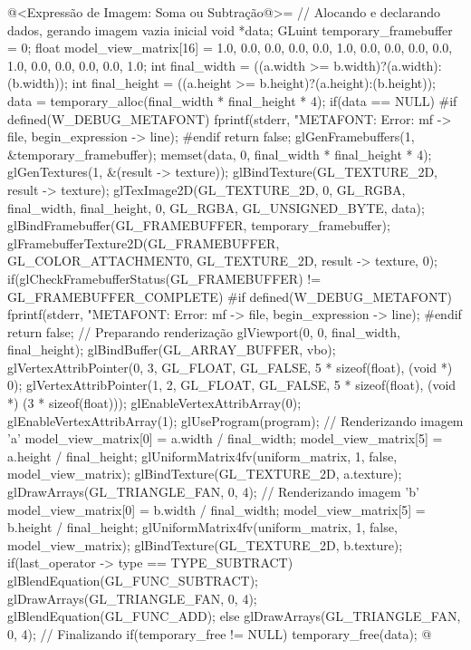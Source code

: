 {\iniciocodigo
@<Expressão de Imagem: Soma ou Subtração@>=
// Alocando e declarando dados, gerando imagem vazia inicial
void *data;
GLuint temporary_framebuffer = 0;
float model_view_matrix[16] = {1.0, 0.0, 0.0, 0.0,
                               0.0, 1.0, 0.0, 0.0,
                               0.0, 0.0, 1.0, 0.0,
                               0.0, 0.0, 0.0, 1.0};
int final_width = ((a.width >= b.width)?(a.width):(b.width));
int final_height = ((a.height >= b.height)?(a.height):(b.height));
data = temporary_alloc(final_width * final_height * 4);
if(data == NULL){
#if defined(W_DEBUG_METAFONT)
  fprintf(stderr, "METAFONT: Error: %
          mf -> file, begin_expression -> line);
#endif
  return false;
}
glGenFramebuffers(1, &temporary_framebuffer);
memset(data, 0, final_width * final_height * 4);
glGenTextures(1, &(result -> texture)); 
glBindTexture(GL_TEXTURE_2D, result -> texture);
glTexImage2D(GL_TEXTURE_2D, 0, GL_RGBA, final_width, final_height, 0, GL_RGBA,
             GL_UNSIGNED_BYTE, data);
glBindFramebuffer(GL_FRAMEBUFFER, temporary_framebuffer);
glFramebufferTexture2D(GL_FRAMEBUFFER, GL_COLOR_ATTACHMENT0, GL_TEXTURE_2D,
                       result -> texture, 0);
if(glCheckFramebufferStatus(GL_FRAMEBUFFER) != GL_FRAMEBUFFER_COMPLETE){
#if defined(W_DEBUG_METAFONT)
  fprintf(stderr, "METAFONT: Error: %
          mf -> file, begin_expression -> line);
#endif
  return false;
}
// Preparando renderização
glViewport(0, 0, final_width, final_height);
glBindBuffer(GL_ARRAY_BUFFER, vbo);
glVertexAttribPointer(0, 3, GL_FLOAT, GL_FALSE, 5 * sizeof(float), (void *) 0);
glVertexAttribPointer(1, 2, GL_FLOAT, GL_FALSE, 5 * sizeof(float),
                      (void *) (3 * sizeof(float)));
glEnableVertexAttribArray(0);
glEnableVertexAttribArray(1);
glUseProgram(program);
// Renderizando imagem 'a'
model_view_matrix[0] = a.width / final_width;
model_view_matrix[5] = a.height / final_height;
glUniformMatrix4fv(uniform_matrix, 1, false, model_view_matrix);
glBindTexture(GL_TEXTURE_2D, a.texture);
glDrawArrays(GL_TRIANGLE_FAN, 0, 4);
// Renderizando imagem 'b'
model_view_matrix[0] = b.width / final_width;
model_view_matrix[5] = b.height / final_height;
glUniformMatrix4fv(uniform_matrix, 1, false, model_view_matrix);
glBindTexture(GL_TEXTURE_2D, b.texture);
if(last_operator -> type == TYPE_SUBTRACT){
  glBlendEquation(GL_FUNC_SUBTRACT);
  glDrawArrays(GL_TRIANGLE_FAN, 0, 4);
  glBlendEquation(GL_FUNC_ADD);
}
else
  glDrawArrays(GL_TRIANGLE_FAN, 0, 4);
// Finalizando
if(temporary_free != NULL)
  temporary_free(data);
@
\fimcodigo

}
